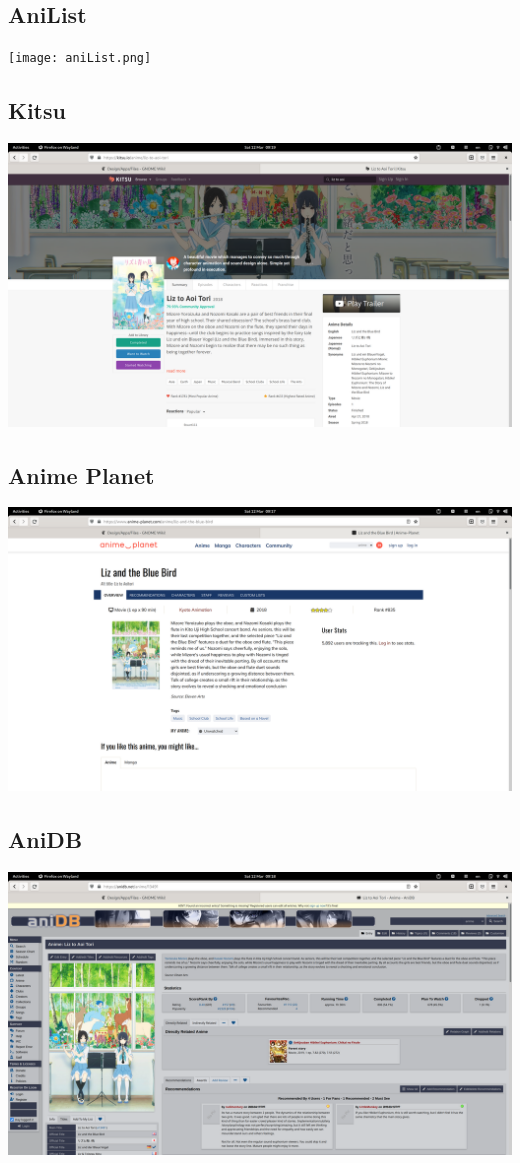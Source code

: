 \documentclass[a4paper]{article}
\begin{document}
\subsection{AniList}
\texttt{[image: aniList.png]}
\subsection{Kitsu}
\includegraphics[width=\textwidth]{Kitsu.png}
\subsection{Anime Planet}
\includegraphics[width=\textwidth]{AP.png}
\subsection{AniDB}
\includegraphics[width=\textwidth]{aniDB.png}
\end{document}
